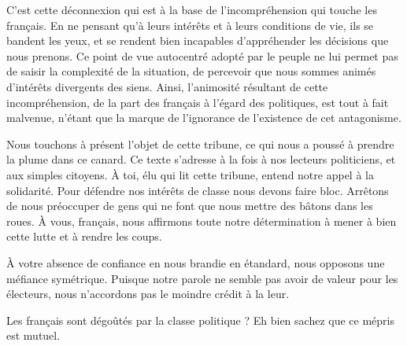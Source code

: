 \documentclass[french,12pt,amstex,a4paper]{article}
\begin{document}
C'est cette déconnexion qui est à la base de l'incompréhension qui touche les français. En ne pensant qu'à leurs intérêts et à leurs conditions de vie, ils se bandent les yeux, et se rendent bien incapables d'appréhender les décisions que nous prenons. Ce point de vue autocentré adopté par le peuple ne lui permet pas de saisir la complexité de la situation, de percevoir que nous sommes animés d'intérêts divergents des siens. Ainsi, l'animosité résultant de cette incompréhension, de la part des français à l'égard des politiques, est tout à fait malvenue, n'étant que la marque de l'ignorance de l'existence de cet antagonisme.

Nous touchons à présent l'objet de cette tribune, ce qui nous a poussé à prendre la plume dans ce canard. Ce texte s'adresse à la fois à nos lecteurs politiciens, et aux simples citoyens. À toi, élu qui lit cette tribune, entend notre appel à la solidarité. Pour défendre nos intérêts de classe nous devons faire bloc. Arrêtons de nous préoccuper de gens qui ne font que nous mettre des bâtons dans les roues. À vous, français, nous affirmons toute notre détermination à mener à bien cette lutte et à rendre les coups.

À votre absence de confiance en nous brandie en étandard, nous opposons une méfiance symétrique. Puisque notre parole ne semble pas avoir de valeur pour les électeurs, nous n'accordons pas le moindre crédit à la leur.

Les français sont dégoûtés par la classe politique ? Eh bien sachez que ce mépris est mutuel.
\end{document}
